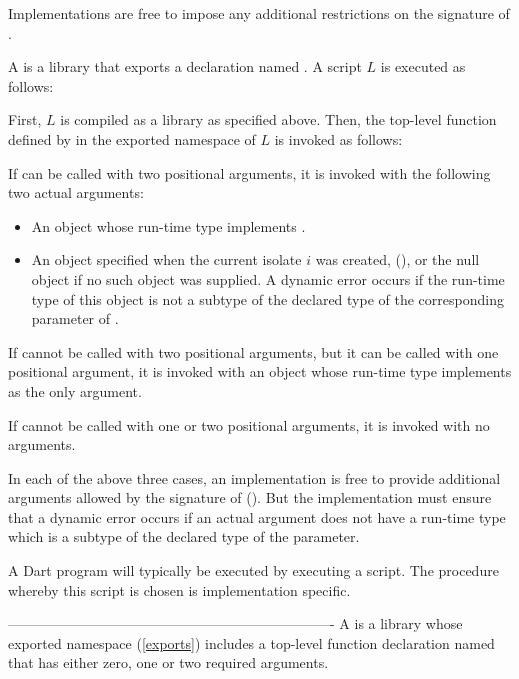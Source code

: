 \documentclass[makeidx]{article}
\begin{document}
{\LMHash{}%
Implementations are free to impose any additional restrictions on
the signature of .

\LMHash{}%
A  is a library that exports a declaration named .
A script $L$ is executed as follows:

\LMHash{}%
First, $L$ is compiled as a library as specified above.
Then, the top-level function defined by 
in the exported namespace of $L$ is invoked as follows:

\LMHash{}%
If  can be called with two positional arguments,
it is invoked with the following two actual arguments:

\begin{itemize}
\item
  An object whose run-time type implements .
\item
  An object specified when the current isolate $i$ was created,
  (),
  or the null object if no such object was supplied.
  A dynamic error occurs if
  the run-time type of this object is not a subtype of
  the declared type of the corresponding parameter of .
\end{itemize}

\LMHash{}%
If  cannot be called with two positional arguments,
but it can be called with one positional argument,
it is invoked with an object whose run-time type implements 
as the only argument.

\LMHash{}%
If  cannot be called with one or two positional arguments,
it is invoked with no arguments.

\LMHash{}%
In each of the above three cases,
an implementation is free to provide additional arguments
allowed by the signature of 
().
But the implementation must ensure that a dynamic error occurs
if an actual argument does not have a run-time type which is
a subtype of the declared type of the parameter.

\LMHash{}%
A Dart program will typically be executed by executing a script.
The procedure whereby this script is chosen is implementation specific.

----------------------------------------------------------------------
\LMHash{}%
A  is a library whose exported namespace (\ref{exports}) includes
a top-level function declaration named 
that has either zero, one or two required arguments.

}
\end{document}
